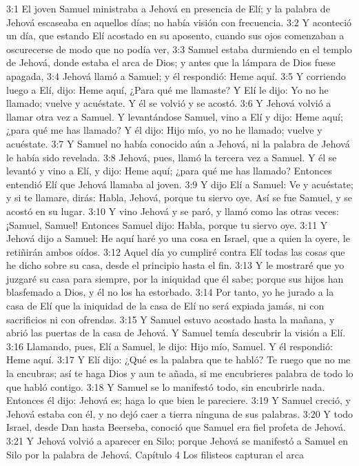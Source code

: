 3:1 El joven Samuel ministraba a Jehová en presencia de Elí; y la palabra de Jehová escaseaba en aquellos días; no había visión con frecuencia.  
3:2 Y aconteció un día, que estando Elí acostado en su aposento, cuando sus ojos comenzaban a oscurecerse de modo que no podía ver,  
3:3 Samuel estaba durmiendo en el templo de Jehová, donde estaba el arca de Dios; y antes que la lámpara de Dios fuese apagada,  
3:4 Jehová llamó a Samuel; y él respondió: Heme aquí.  
3:5 Y corriendo luego a Elí, dijo: Heme aquí, ¿Para qué me llamaste? Y Elí le dijo: Yo no he llamado; vuelve y acuéstate. Y él se volvió y se acostó.  
3:6 Y Jehová volvió a llamar otra vez a Samuel. Y levantándose Samuel, vino a Elí y dijo: Heme aquí; ¿para qué me has llamado? Y él dijo: Hijo mío, yo no he llamado; vuelve y acuéstate.  
3:7 Y Samuel no había conocido aún a Jehová, ni la palabra de Jehová le había sido revelada.  
3:8 Jehová, pues, llamó la tercera vez a Samuel. Y él se levantó y vino a Elí, y dijo: Heme aquí; ¿para qué me has llamado? Entonces entendió Elí que Jehová llamaba al joven.  
3:9 Y dijo Elí a Samuel: Ve y acuéstate; y si te llamare, dirás: Habla, Jehová, porque tu siervo oye. Así se fue Samuel, y se acostó en su lugar.  
3:10 Y vino Jehová y se paró, y llamó como las otras veces: ¡Samuel, Samuel! Entonces Samuel dijo: Habla, porque tu siervo oye.  
3:11 Y Jehová dijo a Samuel: He aquí haré yo una cosa en Israel, que a quien la oyere, le retiñirán ambos oídos.  
3:12 Aquel día yo cumpliré contra Elí todas las cosas que he dicho sobre su casa, desde el principio hasta el fin.  
3:13 Y le mostraré que yo juzgaré su casa para siempre, por la iniquidad que él sabe; porque sus hijos han blasfemado a Dios, y él no los ha estorbado.  
3:14 Por tanto, yo he jurado a la casa de Elí que la iniquidad de la casa de Elí no será expiada jamás, ni con sacrificios ni con ofrendas.  
3:15 Y Samuel estuvo acostado hasta la mañana, y abrió las puertas de la casa de Jehová. Y Samuel temía descubrir la visión a Elí.  
3:16 Llamando, pues, Elí a Samuel, le dijo: Hijo mío, Samuel. Y él respondió: Heme aquí.  
3:17 Y Elí dijo: ¿Qué es la palabra que te habló? Te ruego que no me la encubras; así te haga Dios y aun te añada, si me encubrieres palabra de todo lo que habló contigo.  
3:18 Y Samuel se lo manifestó todo, sin encubrirle nada. Entonces él dijo: Jehová es; haga lo que bien le pareciere.  
3:19 Y Samuel creció, y Jehová estaba con él, y no dejó caer a tierra ninguna de sus palabras.  
3:20 Y todo Israel, desde Dan hasta Beerseba, conoció que Samuel era fiel profeta de Jehová.  
3:21 Y Jehová volvió a aparecer en Silo; porque Jehová se manifestó a Samuel en Silo por la palabra de Jehová.  
Capítulo 4
Los filisteos capturan el arca  

